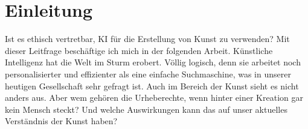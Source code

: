 \section{Einleitung}
\label{sec:introduction}

Ist es ethisch vertretbar, KI für die Erstellung von Kunst zu verwenden? Mit dieser Leitfrage beschäftige ich mich in der folgenden Arbeit. 
Künstliche Intelligenz hat die Welt im Sturm erobert. Völlig logisch, denn sie arbeitet noch personalisierter und effizienter als eine einfache Suchmaschine, was in unserer heutigen Gesellschaft sehr gefragt ist. Auch im Bereich der Kunst sieht es nicht anders aus. Aber wem gehören die Urheberechte, wenn hinter einer Kreation gar kein Mensch steckt? Und welche Auswirkungen kann das auf unser aktuelles Verständnis der Kunst haben?